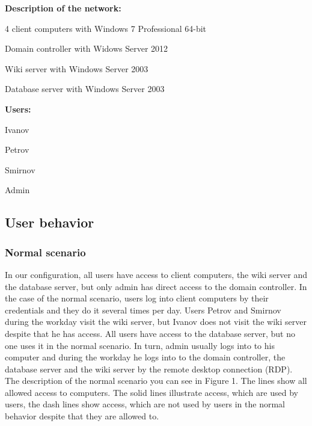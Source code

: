 \begin{compactitem}
\item [\textbf{Description of the network:}]
\item 4 client computers with Windows 7 Professional 64-bit
\item Domain controller with Widows Server 2012
\item Wiki server with Windows Server 2003
\item Database server with Windows Server 2003
\end{compactitem}

\begin{compactitem}
\item [\textbf{Users:}]
\item Ivanov
\item Petrov
\item Smirnov
\item Admin
\end{compactitem}
     
     
\subsection{User behavior}
\subsubsection{Normal scenario}
In our configuration, all users have access to client computers, the wiki server and the database server, but only admin has direct access to the domain controller. In the case of the normal scenario, users log into client computers by their credentials and they do it several times per day. Users Petrov and Smirnov during the workday visit the wiki server, but Ivanov does not visit the wiki server despite that he has access. All users have access to the database server, but no one uses it in the normal scenario. In turn, admin usually logs into to his computer and during the workday he logs into to the domain controller, the database server and the wiki server by the remote desktop connection (RDP). The description of the normal scenario you can see in Figure 1. The lines show all allowed access to computers. The solid lines illustrate access, which are used by users, the dash lines show access, which are not used by users in the normal behavior despite that they are allowed to. 

